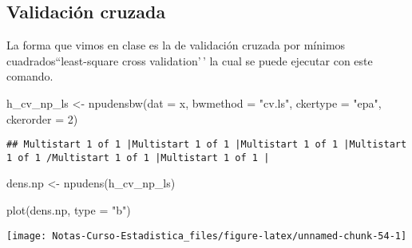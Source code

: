 \documentclass[
  12pt,
]{book}
\newenvironment{Shaded}{\begin{snugshade}}{\end{snugshade}}
\newcommand{\AttributeTok}[1]{\textcolor[rgb]{0.77,0.63,0.00}{#1}}
\newcommand{\DecValTok}[1]{\textcolor[rgb]{0.00,0.00,0.81}{#1}}
\newcommand{\FunctionTok}[1]{\textcolor[rgb]{0.00,0.00,0.00}{#1}}
\newcommand{\NormalTok}[1]{#1}
\newcommand{\OtherTok}[1]{\textcolor[rgb]{0.56,0.35,0.01}{#1}}
\newcommand{\StringTok}[1]{\textcolor[rgb]{0.31,0.60,0.02}{#1}}
\theoremstyle{definition}
\theoremstyle{definition}
\theoremstyle{definition}
\theoremstyle{definition}
\theoremstyle{remark}
\begin{document}
\hypertarget{validaciuxf3n-cruzada-1}{%
\subsection{Validación cruzada}\label{validaciuxf3n-cruzada-1}}

La forma que vimos en clase es la de validación cruzada por mínimos
cuadrados``least-square cross validation'\,' la cual se puede ejecutar
con este comando.

\begin{Shaded}
\begin{Highlighting}[]
\NormalTok{h\_cv\_np\_ls }\OtherTok{\textless{}{-}} \FunctionTok{npudensbw}\NormalTok{(}\AttributeTok{dat =}\NormalTok{ x, }\AttributeTok{bwmethod =} \StringTok{"cv.ls"}\NormalTok{,}
    \AttributeTok{ckertype =} \StringTok{"epa"}\NormalTok{, }\AttributeTok{ckerorder =} \DecValTok{2}\NormalTok{)}
\end{Highlighting}
\end{Shaded}

\begin{verbatim}
## Multistart 1 of 1 |Multistart 1 of 1 |Multistart 1 of 1 |Multistart 1 of 1 /Multistart 1 of 1 |Multistart 1 of 1 |                   
\end{verbatim}

\begin{Shaded}
\begin{Highlighting}[]
\NormalTok{dens.np }\OtherTok{\textless{}{-}} \FunctionTok{npudens}\NormalTok{(h\_cv\_np\_ls)}

\FunctionTok{plot}\NormalTok{(dens.np, }\AttributeTok{type =} \StringTok{"b"}\NormalTok{)}
\end{Highlighting}
\end{Shaded}

\begin{center}\texttt{[image: Notas-Curso-Estadistica\_files/figure-latex/unnamed-chunk-54-1]} \end{center}
\end{document}
